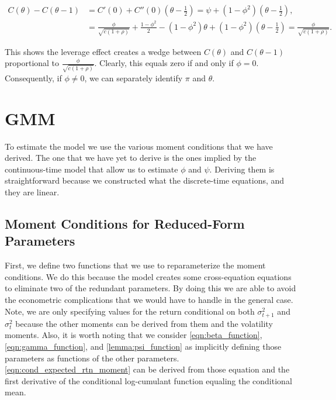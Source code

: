 \documentclass[11pt, letterpaper, twoside, final]{article}
\begin{document}
\begin{align}
    C(\theta) - C(\theta - 1) &= C'(0)  + C''(0) \left(\theta - \frac{1}{2}\right)
%
    =  \psi + (1 - \phi^2) \left(\theta - \frac{1}{2}\right),  \\
%
    &= \frac{\phi}{\sqrt{c (1 + \rho )}} + \frac{1 - \phi^2}{2} - (1 - \phi^2) \theta +  (1 - \phi^2)
       \left(\theta - \frac{1}{2}\right) 
%
    \label{eqn:alpha_difference}
    = \frac{\phi}{\sqrt{c (1 + \rho )}}. 
\end{align}

This shows the leverage effect creates a wedge between $C(\theta)$ and $C(\theta-1)$ proportional to
$\frac{\phi}{\sqrt{c (1 + \rho )}}$.
Clearly, this equals zero if and only if $\phi = 0$.
Consequently, if $\phi \neq 0$, we can separately identify $\pi$ and $\theta$.

\section{GMM}\label{sec:GMM}

To estimate the model we use the various moment conditions that we have derived.
The one that we have yet to derive is the ones implied by the continuous-time model that allow us to estimate
$\phi$ and $\psi$.
Deriving them is straightforward because we constructed what the discrete-time equations, and they are linear.

\subsection{Moment Conditions for Reduced-Form Parameters}\label{sec:moment_conditions}

First, we define two functions that we use to reparameterize the moment conditions.
We do this because the model creates some cross-equation equations to eliminate two of the redundant parameters.
By doing this we are able to avoid the econometric complications that we would have to handle in the general
case.
Note, we are only specifying values for the return conditional on both $\sigma^2_{t+1}$ and $\sigma^2_t$ because
the other moments can be derived from them and the volatility moments.
Also, it is worth noting that we consider \cref{eqn:beta_function}, \cref{eqn:gamma_function}, and
\cref{lemma:psi_function} as implicitly defining those parameters as functions of the other parameters.
\cref{eqn:cond_expected_rtn_moment} can be derived from those equation and the first derivative of the conditional
log-cumulant function equaling the conditional mean.
\end{document}
